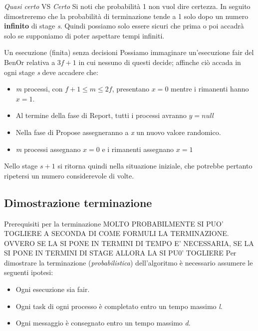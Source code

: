 \documentclass{beamer}
\begin{document}
\begin{frame}{\textit{Quasi certo} VS \textit{Certo}}
    Si noti che probabilità 1 non vuol dire certezza. In seguito dimostreremo che la probabilità di terminazione tende a 1 solo dopo un numero \textbf{infinito} di stage \textit{s}. Quindi possiamo solo essere sicuri che prima o poi accadrà solo se supponiamo di poter aspettare tempi infiniti.
\end{frame}

\begin{frame}{Un esecuzione (finita) senza decisioni}
    Possiamo immaginare un'esecuzione fair del BenOr relativa a $3f+1$ in cui nessuno di questi decide; affinche ciò accada in ogni stage \textit{s} deve accadere che:
    \begin{itemize}
        \item \textit{m} processi, con $f+1 \leq m \leq 2f$, presentano $x = 0$ mentre i rimanenti hanno $x = 1$.
        \item Al termine della fase di Report, tutti i processi avranno $y = null$ %
        \item Nella fase di Propose assegneranno a \textit{x} un nuovo valore randomico.
        \item \textit{m} processi assegnano $x = 0$ e i rimanenti assegnano $x = 1$
    \end{itemize}
    Nello stage $s + 1$ si ritorna quindi nella situazione iniziale, che potrebbe pertanto ripetersi un numero considerevole di volte.
\end{frame}

\subsection{Dimostrazione terminazione}
\begin{frame}{Prerequisiti per la terminazione}
    MOLTO PROBABILMENTE SI PUO' TOGLIERE A SECONDA DI COME FORMULI LA TERMINAZIONE.
    OVVERO SE LA SI PONE IN TERMINI DI TEMPO E' NECESSARIA, SE LA SI PONE IN TERMINI DI STAGE ALLORA LA SI PU0' TOGLIERE
    Per dimostrare la terminazione (\textit{probabilistica}) dell'algoritmo è necessario assumere le seguenti ipotesi:  
    \begin{itemize}
        \item Ogni esecuzione sia fair.
        \item Ogni task di ogni processo è completato entro un tempo massimo \textit{l}.
        \item Ogni messaggio è consegnato entro un tempo massimo \textit{d}.
    \end{itemize}
\end{frame}
\end{document}
